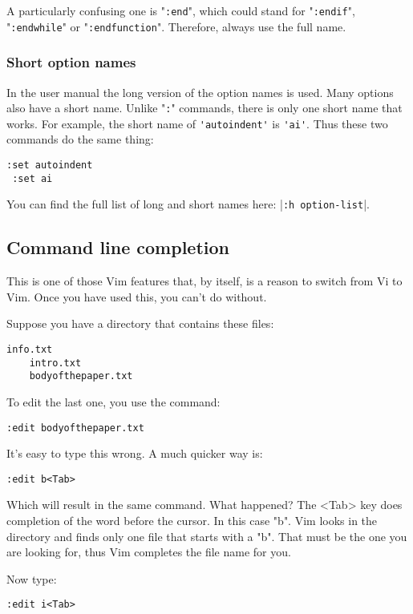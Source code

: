 A particularly confusing one is "\verb!:end!", which could stand for "\verb!:endif!", "\verb!:endwhile!" or "\verb!:endfunction!".
Therefore, always use the full name.
\subsubsection{Short option names}
In the user manual the long version of the option names is used.
Many options also have a short name.
Unlike "\verb!:!" commands, there is only one short name that works.
For example, the short name of \verb!'autoindent'! is \verb!'ai'!.
Thus these two commands do the same thing:

\begin{Verbatim}[samepage=true]
 :set autoindent
 :set ai
\end{Verbatim}

You can find the full list of long and short names here: |\verb!:h option-list!|.
\subsection{Command line completion}
This is one of those Vim features that, by itself, is a reason to switch from Vi to Vim.
Once you have used this, you can't do without.

Suppose you have a directory that contains these files:

\begin{Verbatim}[samepage=true]
    info.txt
    intro.txt
    bodyofthepaper.txt
\end{Verbatim}

To edit the last one, you use the command:

\begin{Verbatim}[samepage=true]
 :edit bodyofthepaper.txt
\end{Verbatim}

It's easy to type this wrong.
A much quicker way is:

\begin{Verbatim}[samepage=true]
 :edit b<Tab>
\end{Verbatim}

Which will result in the same command.
What happened?
The <Tab> key does completion of the word before the cursor.
In this case "b".
Vim looks in the directory and finds only one file that starts with a "b".
That must be the one you are looking for, thus Vim completes the file name for you.

Now type:

\begin{Verbatim}[samepage=true]
 :edit i<Tab>
\end{Verbatim}

